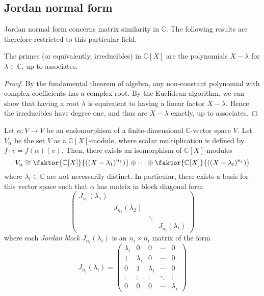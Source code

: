 \subsection{Jordan normal form}
Jordan normal form concerns matrix similarity in \( \mathbb C \).
The following results are therefore restricted to this particular field.
\begin{lemma}
	The primes (or equivalently, irreducibles) in \( \mathbb C[X] \) are the polynomials \( X - \lambda \) for \( \lambda \in \mathbb C \), up to associates.
\end{lemma}
\begin{proof}
	By the fundamental theorem of algebra, any non-constant polynomial with complex coefficients has a complex root.
	By the Euclidean algorithm, we can show that having a root \( \lambda \) is equivalent to having a linear factor \( X - \lambda \).
	Hence the irreducibles have degree one, and thus are \( X - \lambda \) exactly, up to associates.
\end{proof}
\begin{theorem}
	Let \( \alpha \colon V \to V \) be an endomorphism of a finite-dimensional \( \mathbb C \)-vector space \( V \).
	Let \( V_\alpha \) be the set \( V \) as a \( \mathbb C[X] \)-module, where scalar multiplication is defined by \( f\cdot v = f(\alpha)(v) \).
	Then, there exists an isomorphism of \( \mathbb C[X] \)-modules
	\[
		V_\alpha \cong \faktor{\mathbb C[X]}{\qty((X-\lambda_1)^{n_1})} \oplus \dots \oplus \faktor{\mathbb C[X]}{\qty((X-\lambda_t)^{n_t})}
	\]
	where \( \lambda_i \in \mathbb C \) are not necessarily distinct.
	In particular, there exists a basis for this vector space such that \( \alpha \) has matrix in block diagonal form
	\[
		\begin{pmatrix}
			J_{n_1}(\lambda_1)                                  \\
			 & J_{n_2}(\lambda_2)                               \\
			 &                    & \ddots                      \\
			 &                    &        & J_{n_t}(\lambda_t)
		\end{pmatrix}
	\]
	where each \textit{Jordan block} \( J_{n_i}(\lambda_i) \) is an \( n_i \times n_i \) matrix of the form
	\[
		J_{n_i}(\lambda_i) = \begin{pmatrix}
			\lambda_i & 0         & 0         & \cdots & 0         \\
			1         & \lambda_i & 0         & \cdots & 0         \\
			0         & 1         & \lambda_i & \cdots & 0         \\
			\vdots    & \vdots    & \vdots    & \ddots & \vdots    \\
			0         & 0         & 0         & \cdots & \lambda_i
		\end{pmatrix}
	\]
\end{theorem}

